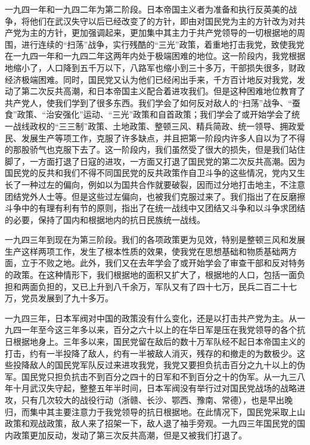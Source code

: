 一九四一年和一九四二年为第二阶段。日本帝国主义者为准备和执行反英美的战争，将他们在武汉失守以后已经改变了的方针，即由对国民党为主的方针改为对共产党为主的方针，更加强调起来，更加集中其主力于共产党领导的一切根据地的周围，进行连续的“扫荡”战争，实行残酷的“三光”政策，着重地打击我党，致使我党在一九四一年和一九四二年这两年内处于极端困难的地位。这一阶段内，我党根据地缩小了，人口降到五千万以下，八路军也缩小到三十多万，干部损失很多，财政经济极端困难。同时，国民党又认为他们已经闲出手来，千方百计地反对我党，发动了第二次反共高潮，和日本帝国主义配合着进攻我们。但是这种困难地位教育了共产党人，使我们学到了很多东西。我们学会了如何反对敌人的“扫荡”战争、“蚕食”政策、“治安强化”运动、“三光”政策和自首政策；我们学会了或开始学会了统一战线政权的“三三制”政策、土地政策、整顿三风、精兵简政、统一领导、拥政爱民、发展生产等项工作，克服了许多缺点，并且把第一阶段内许多人自以为了不得的那股骄气也克服下去了。这一阶段内，我们虽然受了很大的损失，但是我们站住脚了，一方面打退了日寇的进攻，一方面又打退了国民党的第二次反共高潮。因为国民党的反共和我们不得不同国民党的反共政策作自卫斗争的这些情况，党内又生长了一种过左的偏向，例如以为国共合作就要破裂，因而过分地打击地主，不注意团结党外人士等。但是这些过左偏向，也被我们克服过来了。我们指出了在反磨擦斗争中的有理有利有节的原则，指出了在统一战线中又团结又斗争和以斗争求团结的必要，保持了国内和根据地内的抗日民族统一战线。

一九四三年到现在为第三阶段。我们的各项政策更为见效，特别是整顿三风和发展生产这样两项工作，发生了根本性质的效果，使我党在思想基础和物质基础两方面，立于不败之地。此外，我们又在去年学会了或开始学会了审查干部和反对特务的政策。在这种情形下，我们根据地的面积又扩大了，根据地的人口，包括一面负担和两面负担的，又已上升到八千余万，军队又有了四十七万，民兵二百二十七万，党员发展到了九十多万。

一九四三年，日本军阀对中国的政策没有什么变化，还是以打击共产党为主。从一九四一年至今这三年多以来，百分之六十以上的在华日军是压在我党领导的各个抗日根据地身上。三年多以来，国民党留在敌后的数十万军队经不起日本帝国主义的打击，约有一半投降了敌人，约有一半被敌人消灭，残存的和撤走的为数极少。这些投降敌人的国民党军队反过来进攻我党，我党又要担负抗击百分之九十以上的伪军。国民党只担负抗击不到百分之四十的日军和不到百分之十的伪军。从一九三八年十月武汉失守起，整整五年半时间，日本军阀没有举行过对国民党战场的战略进攻，只有几次较大的战役行动（浙赣、长沙、鄂西、豫南、常德），也是早出晚归，而集中其主要注意力于我党领导的抗日根据地。在此情况下，国民党采取上山政策和观战政策，敌人来了招架一下，敌人退了袖手旁观。一九四三年国民党的国内政策更加反动，发动了第三次反共高潮，但是又被我们打退了。


